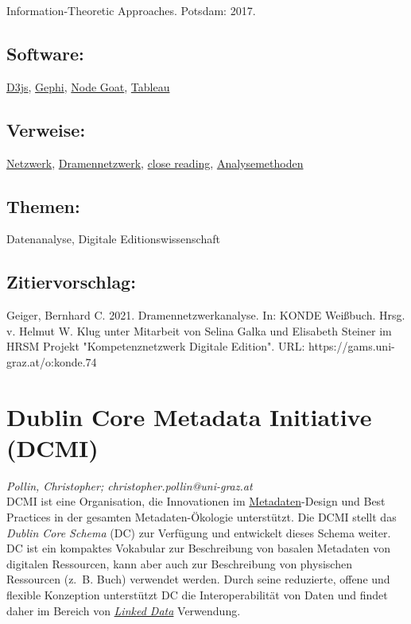 \documentclass{article}
\begin{document}
\begin{itemize}
                              Information-Theoretic Approaches. Potsdam: 2017.\end{itemize}\subsection*{Software:}\href{https://d3js.org}{D3js}, \href{https://gephi.org/}{Gephi}, \href{https://nodegoat.net/}{Node Goat}, \href{https://public.tableau.com/s/}{Tableau}\subsection*{Verweise:}\href{https://gams.uni-graz.at/o:konde.144}{Netzwerk}, \href{https://gams.uni-graz.at/o:konde.73}{Dramennetzwerk}, \href{https://gams.uni-graz.at/o:konde.71}{close reading}, \href{https://gams.uni-graz.at/o:konde.16}{Analysemethoden}\subsection*{Themen:}Datenanalyse, Digitale Editionswissenschaft\subsection*{Zitiervorschlag:}Geiger, Bernhard C. 2021. Dramennetzwerkanalyse. In: KONDE Weißbuch. Hrsg. v. Helmut W. Klug unter Mitarbeit von Selina Galka und Elisabeth Steiner im HRSM Projekt "Kompetenznetzwerk Digitale Edition". URL: https://gams.uni-graz.at/o:konde.74\newpage\section*{Dublin Core Metadata Initiative (DCMI)} \emph{Pollin, Christopher; christopher.pollin@uni-graz.at }\\
        
    DCMI ist eine Organisation, die Innovationen im \href{http://gams.uni-graz.at/o:konde.25}{Metadaten}-Design und Best Practices in der gesamten Metadaten-Ökologie unterstützt. Die DCMI stellt das \emph{Dublin Core Schema} (DC) zur Verfügung und entwickelt dieses Schema weiter. DC ist ein kompaktes Vokabular zur Beschreibung von basalen Metadaten von digitalen Ressourcen, kann aber auch zur Beschreibung von physischen Ressourcen (z. B. Buch) verwendet werden. Durch seine reduzierte, offene und flexible Konzeption unterstützt DC die Interoperabilität von Daten und findet daher im Bereich von \emph{\href{http://gams.uni-graz.at/o:konde.8}{Linked Data}} Verwendung.\\
            
\end{document}

